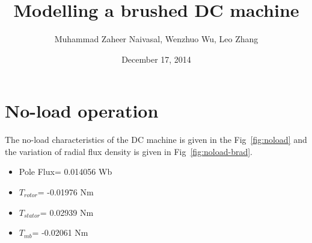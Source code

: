 \documentclass[a4paper,11pt]{article}
\begin{document}
\title{\bfseries Modelling a brushed DC machine}
\author{Muhammad Zaheer Naivasal, Wenzhuo Wu, Leo Zhang}
\date{December 17, 2014}
\maketitle

\section{No-load operation}
The no-load characteristics of the DC machine is given in the Fig~\ref{fig:noload} and the variation of radial flux density is given in Fig~\ref{fig:noload-brad}.
\begin{itemize}
\item Pole Flux= 0.014056 Wb
\item $T_{rotor}$= -0.01976 Nm
\item $T_{stator}$= 0.02939 Nm
\item $T_{mb}$= -0.02061 Nm
\end{itemize}
\end{document}
